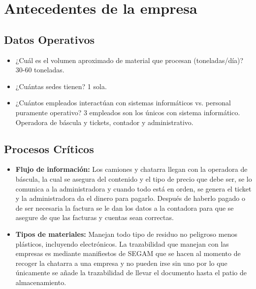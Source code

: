 \section{Antecedentes de la empresa}
\subsection{Datos Operativos}
\begin{itemize}
    \item ¿Cuál es el volumen aproximado de material que procesan (toneladas/día)? 30-60 toneladas.
    \item ¿Cuántas sedes tienen? 1 sola.
    \item ¿Cuántos empleados interactúan con sistemas informáticos vs. personal puramente operativo? 3 empleados son los únicos con sistema informático. Operadora de báscula y tickets, contador y administrativo.
\end{itemize}

\subsection{Procesos Críticos}
\begin{itemize}
    \item \textbf{Flujo de información:} Los camiones y chatarra llegan con la operadora de báscula, la cual se asegura del contenido y el tipo de precio que debe ser, se lo comunica a la administradora y cuando todo está en orden, se genera el ticket y la administradora da el dinero para pagarlo. Después de haberlo pagado o de ser necesaria la factura se le dan los datos a la contadora para que se asegure de que las facturas y cuentas sean correctas.
    \item \textbf{Tipos de materiales:} Manejan todo tipo de residuo no peligroso menos plásticos, incluyendo electrónicos. La trazabilidad que manejan con las empresas es mediante manifiestos de SEGAM que se hacen al momento de recoger la chatarra a una empresa y no pueden irse sin uno por lo que únicamente se añade la trazabilidad de llevar el documento hasta el patio de almacenamiento.
\end{itemize}


